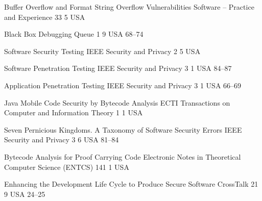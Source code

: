 \begin{thebibliography}{9}
		{
			\biband
			}
		{Buffer Overflow and Format String Overflow Vulnerabilities}
		{Software -- Practice and Experience}
		{33}
		{5}
		{USA}
		{}
		{}
	
		{
			\biband
			}
		{Black Box Debugging}
		{Queue}
		{1}
		{9}
		{USA}
		{}
		{68--74}
	
		{
			\biband
			}
		{Software Security Testing}
		{{IEEE} Security and Privacy}
		{2}
		{5}
		{USA}
		{}
		{}
	
		{
			\biband
			\biband
			}
		{Software Penetration Testing}
		{{IEEE} Security and Privacy}
		{3}
		{1}
		{USA}
		{}
		{84--87}
	
		{}
		{Application Penetration Testing}
		{{IEEE} Security and Privacy}
		{3}
		{1}
		{USA}
		{}
		{66--69}
	
		{
			\biband
			\biband
			\biband
			}
		{Java Mobile Code Security by Bytecode Analysis}
		{{ECTI} Transactions on Computer and Information Theory}
		{1}
		{1}
		{USA}
		{}
		{}
	
		{
			\biband
			\biband
			}
		{Seven Pernicious Kingdoms. A Taxonomy of Software Security Errors}
		{{IEEE} Security and Privacy}
		{3}
		{6}
		{USA}
		{}
		{81--84}
	
		{
			\biband
			\biband
			}
		{Bytecode Analysis for Proof Carrying Code}
		{Electronic Notes in Theoretical Computer Science ({ENTCS})}
		{141}
		{1}
		{USA}
		{}
		{}
	
		{}
		{Enhancing the Development Life Cycle to Produce Secure Software}
		{CrossTalk}
		{21}
		{9}
		{USA}
		{}
		{24--25}
	

\end{thebibliography}

